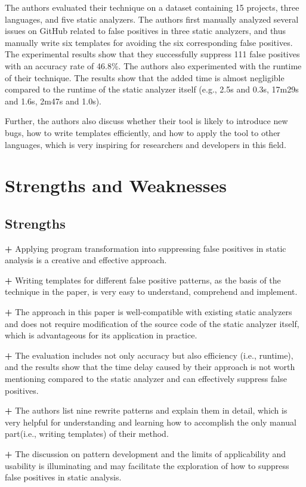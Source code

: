 \documentclass[conference]{IEEEtran}
\begin{document}
The authors evaluated their technique on a dataset containing 15 projects, three languages, and five static analyzers. The authors first manually analyzed several issues on GitHub related to false positives in three static analyzers, and thus manually write six templates for avoiding the six corresponding false positives. The experimental results show that they successfully suppress 111 false positives with an accuracy rate of 46.8\%. The authors also experimented with the runtime of their technique. The results show that the added time is almost negligible compared to the runtime of the static analyzer itself (e.g., 2.5s and 0.3s, 17m29s and 1.6s, 2m47s and 1.0s).

Further, the authors also discuss whether their tool is likely to introduce new bugs, how to write templates efficiently, and how to apply the tool to other languages, which is very inspiring for researchers and developers in this field.

\section{Strengths and Weaknesses}
\subsection{Strengths}
\textbf{+} Applying program transformation into suppressing false positives in static analysis is a creative and effective approach.

\textbf{+} Writing templates for different false positive patterns, as the basis of the technique in the paper,  is very easy to understand, comprehend and implement.

\textbf{+} The approach in this paper is well-compatible with existing static analyzers and does not require modification of the source code of the static analyzer itself, which is advantageous for its application in practice.

\textbf{+} The evaluation includes not only accuracy but also efficiency (i.e., runtime), and the results show that the time delay caused by their approach is not worth mentioning compared to the static analyzer and can effectively suppress false positives.

\textbf{+} The authors list nine rewrite patterns and explain them in detail, which is very helpful for understanding and learning how to accomplish the only manual part(i.e., writing templates) of their method.

\textbf{+} The discussion on pattern development and the limits of applicability and usability is illuminating and may facilitate the exploration of how to suppress false positives in static analysis.
\end{document}
